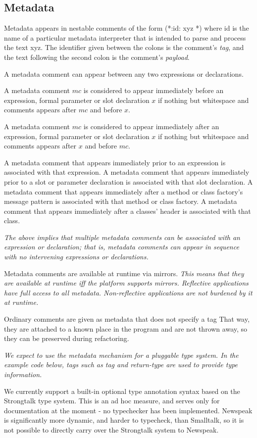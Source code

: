 \documentclass{article}
\newcommand{\code}[1]{{\sf #1}}
\begin{document}
\subsection{Metadata}
\label{metadata}

Metadata appears in nestable comments of the form \code{ (*:id: xyz *)} where \code{id} is the name of a particular metadata interpreter that is intended to parse and process the text \code{xyz}. 
The identifier given between the colons is the comment's  {\em tag}, and the text following the second colon is the comment's {\em payload}.

A metadata comment can appear between any two expressions or declarations.  

A metadata comment $mc$ is considered to appear immediately before an expression, formal parameter or slot declaration  $x$ if nothing but whitespace and comments appears after $mc$ and before $x$.

A metadata comment $mc$ is considered to appear immediately after an expression, formal parameter or slot declaration  $x$ if nothing but whitespace and comments appears after $x$ and before $mc$.

A metadata comment that appears immediately prior to an expression is associated with that expression. A metadata comment that appears immediately prior to a slot or parameter declaration is associated with that slot declaration.
A metadata comment that appears immediately after a method or class factory's message pattern is associated with that method or class factory. A metadata comment that appears immediately after a classes' header is associated with that class. 

{\it The above implies that multiple metadata comments can be associated with an expression or declaration; that is, metadata comments can appear in sequence with no intervening expressions or declarations.
} 

Metadata comments are available at runtime via mirrors.
{\it
This means that they are available at runtime iff the platform supports mirrors. Reflective applications have full access to all metadata. Non-reflective applications are not burdened by it at runtime.
}

Ordinary comments are given as metadata that does not specify a tag That way, they are attached to a known place in the program and are not thrown away, so they can be preserved during refactoring.


{\it
We expect to use the metadata mechanism for a pluggable type system. In the example code below, tags such as {\em tag} and {\em return-type} are used to provide type information.

We currently support a built-in optional type annotation syntax based on the Strongtalk type system. This is an ad hoc measure, and serves only for documentation at the moment - no typechecker has been implemented. Newspeak is significantly more dynamic, and harder to typecheck, than Smalltalk, so it is not possible to directly carry over the Strongtalk system to Newspeak. 
}
\end{document}
